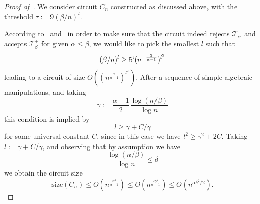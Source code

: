 \documentclass[10pt,a4paper]{article}
\newcommand{\size}{\mathrm{size}}
\begin{document}
\begin{proof}[Proof of~]

We consider circuit $C_n$ constructed as discussed above, with the threshold $\tau := 9 (\beta/n)^l$.  

According to~ and~ in order to make sure that the circuit indeed rejects $\mathcal{T}^-_{\alpha}$ and accepts $\mathcal{T}^+_{\beta}$ for given $\alpha \leq \beta$, we would like to pick the smallest $l$ such that
\begin{equation*}
    (\beta/n)^l \geq 5` (n^{-\frac{2}{\alpha-1}})^{l^2}
\end{equation*}
leading to a circuit of size $O((n^{\frac{2}{\alpha - 1}})^{l^2})$. After a sequence of simple algebraic manipulations, and taking
$$
\gamma := \frac{\alpha - 1}{2} \frac{\log(n/\beta)}{\log n}
$$
this condition is implied by
$$
l \geq \gamma + C/\gamma 
$$
for some universal constant $C$, since in this case we have $l^2 \geq \gamma^2 + 2C$. Taking $l := \gamma + C/\gamma$, and observing that by assumption we have
\begin{equation*}
    \frac{\log(n/\beta)}{\log n} \leq \delta
\end{equation*} 
we obtain the circuit size
\begin{equation*}
    \size(C_n) \leq O(n^{\frac{2l^2 }{\alpha - 1}}) \leq  O(n^{\frac{2\gamma^2}{\alpha-1}}) \leq O(n^{\alpha \delta^2/2}).
\end{equation*}
\end{proof}



\end{document}
